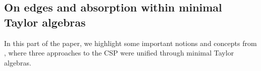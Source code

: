 \documentclass[11pt]{amsart}
\newtheorem{thm}{Theorem}
\theoremstyle{definition}
\theoremstyle{remark}
\theoremstyle{plain}
\def\A{\mathbf{A}}
\begin{document}



\subsection{On edges and absorption within minimal Taylor algebras}

In this part of the paper, we highlight some important notions and concepts from \cite{dreamteam}, where three approaches to the CSP were unified through minimal Taylor algebras. 
\end{document}
